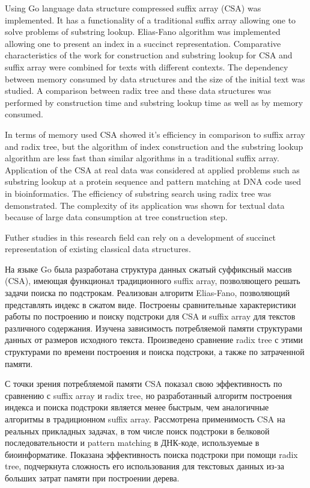 
Using Go language data structure compressed suffix array (CSA) was implemented.
It has a functionality of a traditional suffix array allowing one to solve
problems of substring lookup. Elias-Fano algorithm was implemented allowing one
to present an index in a succinct representation. Comparative characteristics of
the work for construction and substring lookup for CSA and suffix array were combined
for texts with different contexts.
The dependency between memory consumed by data structures and the size of the initial text
was studied. A comparison between radix tree and these data structures was performed
by construction time and substring lookup time as well as by memory consumed.

In terms of memory used CSA showed it's efficiency in comparison to suffix array and radix tree,
but the algorithm of index construction and the substring lookup algorithm are less fast
than similar algorithms in a traditional suffix array. Application of the CSA at real data
was considered at applied problems such as substring lookup at a protein sequence and
pattern matching at DNA code used in bioinformatics.
The efficiency of substring search using radix tree was demonstrated. The complexity
of its application was shown for textual data because of large data consumption at tree construction step.

Futher studies in this research field can rely on a development of succinct representation of
existing classical data structures.

На языке Go была разработана структура данных сжатый суффиксный массив (CSA), имеющая
функционал традиционного suffix array, позволяющего решать задачи поиска по подстрокам.
Реализован алгоритм Elias-Fano, позволяющий представлять индекс в сжатом виде.
Построены сравнительные характеристики работы по построению и поиску подстроки
для CSA и suffix array для текстов различного содержания.
Изучена зависимость потребляемой памяти структурами данных от размеров исходного текста.
Произведено сравнение radix tree с этими структурами по времени построения и поиска подстроки,
а также по затраченной памяти.

С точки зрения потребляемой памяти CSA показал свою эффективность по сравнению с suffix array и radix tree,
но разработанный алгоритм построения индекса и поиска подстроки является менее быстрым,
чем аналогичные алгоритмы в традиционном suffix array. Рассмотрена применимость CSA на реальных
прикладных задачах, в том числе поиск подстроки в белковой последовательности
и pattern matching в ДНК-коде, используемые в биоинформатике.
Показана эффективность поиска подстроки при помощи radix tree,
подчеркнута сложность его использования для текстовых данных из-за больших
затрат памяти при построении дерева.

